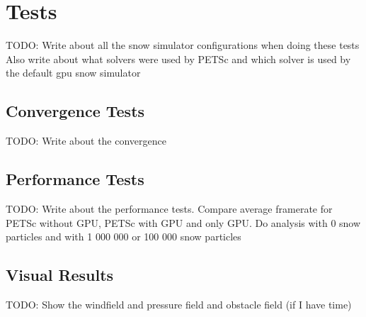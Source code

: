 \section{Tests}

TODO: Write about all the snow simulator configurations when doing these tests
Also write about what solvers were used by PETSc and which solver is used
by the default gpu snow simulator

\subsection{Convergence Tests}

TODO: Write about the convergence

\subsection{Performance Tests}

TODO: Write about the performance tests.
Compare average framerate for PETSc without GPU, PETSc with GPU and only GPU.
Do analysis with 0 snow particles and with 1 000 000 or 100 000 snow particles 

\subsection{Visual Results}

TODO: Show the windfield and pressure field and obstacle field (if I have time)
